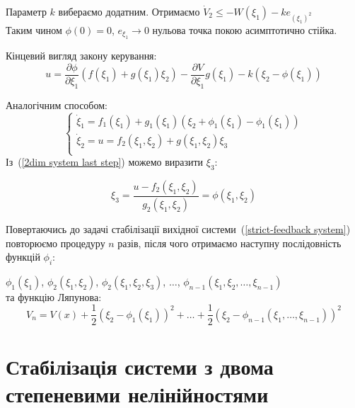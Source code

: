 \documentclass{article}
\begin{document}
Параметр $k$ вибераємо додатним.
Отримаємо $\dot V_2 \leq -W(\xi_1) - ke_{(\xi_1)^2}$ \\
Таким чином $\phi(0)=0$, $e_{\xi_1} \rightarrow 0$ нульова точка покою асимптотично стійка.

Кінцевий вигляд закону керування:
\begin{equation}
    u = \frac{\partial \phi}{\partial \xi_1}(f(\xi_1)+g(\xi_1)\xi_2)-
    \frac{\partial V}{\partial \xi_1}g(\xi_1)-k(\xi_2-\phi(\xi_1))
\end{equation}

Аналогічним способом:
\begin{equation} \label{2dim system last step}
    \begin{cases}
        \dot \xi_1 = f_1(\xi_1)+g_1(\xi_1)(\xi_2 + \phi_1(\xi_1)-\phi_1(\xi_1))\\
        \dot \xi_2 = u = f_2(\xi_1,\xi_2)+g(\xi_1,\xi_2)\xi_3\\
    \end{cases}
\end{equation}
Із~(\ref{2dim system last step}) можемо виразити $\xi_3$:

\begin{equation}
    \xi_3 = \frac{u - f_2(\xi_1, \xi_2)}{g_2(\xi_1, \xi_2)} = \phi(\xi_1,\xi_2)
\end{equation}

Повертаючись до задачі стабілізації вихідної системи~(\ref{strict-feedback system}) 
повторюємо процедуру $n$ разів, після чого отримаємо наступну послідовність функцій $\phi_i$:

$\phi_1(\xi_1)$, $\phi_2(\xi_1,\xi_2)$, $\phi_2(\xi_1,\xi_2,\xi_3)$, $\dots$,
$\phi_{n-1}(\xi_1,\xi_2, \dots, \xi_{n-1})$\\
та функцію Ляпунова:
\begin{equation}
    V_n = V(x)+\frac{1}{2}(\xi_2-\phi_1(\xi_1))^2 + \dots 
    +\frac{1}{2}(\xi_2-\phi_{n-1}(\xi_1, \dots, \xi_{n-1}))^2
\end{equation}

\pagebreak
\section{Стабілізація системи з двома степеневими нелінійностями}
\end{document}
